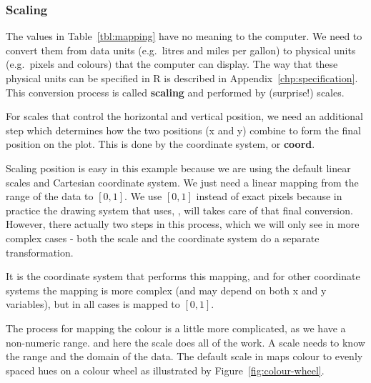 \subsubsection{Scaling} 

The values in Table~\ref{tbl:mapping} have no meaning to the computer.  We need to convert them from data units (e.g.\ litres and miles per gallon) to physical units (e.g.\ pixels and colours) that the computer can display.  The way that these physical units can be specified in R is described in Appendix~\ref{chp:specification}.  This conversion process is called {\bf scaling} and performed by (surprise!) scales.  

For scales that control the horizontal and vertical position, we need an additional step which determines how the two positions (x and y) combine to form the final position on the plot.  This is done by the coordinate system, or {\bf coord}.

Scaling position is easy in this example because we are using the default  linear scales and Cartesian coordinate system.  We just need a linear mapping from the range of the data to $[0, 1]$.  We use $[0, 1]$ instead of exact pixels because in practice the drawing system that \ggplot uses, , will takes care of that final conversion.  However, there actually two steps in this process, which we will only see in more complex cases - both the scale and the coordinate system do a separate transformation.

It is the coordinate system that performs this mapping, and for other coordinate systems the mapping is more complex (and may depend on both x and y variables), but in all cases is mapped to $[0, 1]$.

The process for mapping the colour is a little more complicated, as we have a  non-numeric range.  and here the scale does all of the work.  A scale needs to know the range and the domain of the data.  The default scale in \ggplot maps colour to evenly spaced hues on a colour wheel as illustrated by Figure~\ref{fig:colour-wheel}.



